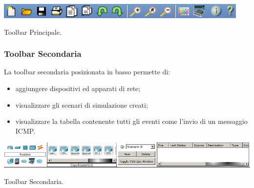 \begin{sfigure}
    \centering
    \captionsetup{type=figure}
    \includegraphics[scale=.5]{images/02.packet-tracer/top.png}
    \caption{Toolbar Principale.}
\end{sfigure}

\subsubsection{Toolbar Secondaria}
La toolbar secondaria posizionata in basso permette di:

\begin{itemize}
    \item aggiungere dispositivi ed apparati di rete;
    \item visualizzare gli scenari di simulazione creati;
    \item visualizzare la tabella contenente tutti gli eventi come l'invio di un messaggio ICMP.
\end{itemize}

\begin{sfigure}
    \centering
    \captionsetup{type=figure}
    \includegraphics[scale=.17]{images/02.packet-tracer/bottom.png}
    \caption{Toolbar Secondaria.}
\end{sfigure}

